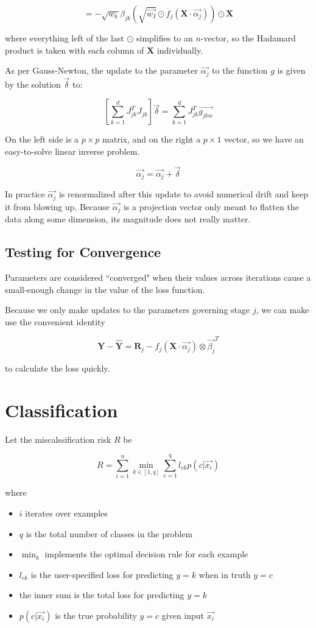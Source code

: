 \documentclass[12pt]{article}
\begin{document}
$$= -\sqrt{w_k} \beta_{jk} (\sqrt{\vec{w_I}} \odot \dot{f_j}(\pmb{X} \cdot \vec{\alpha_j})) \odot \pmb{X}$$

where everything left of the last $\odot$ simplifies to an $n$-vector, so the Hadamard product is taken with each column of $\pmb{X}$ individually.\newline

As per Gauss-Newton, the update to the parameter $\vec{\alpha_j}$ to the function $g$ is given by the solution $\vec{\delta}$ to:

$$\left[ \sum_{k=1}^d J_{jk}^T J_{jk} \right] \vec{\delta} = \sum_{k=1}^d J_{jk}^T \vec{g_{jkw}}$$

On the left side is a $p \times p$ matrix, and on the right a $p \times 1$ vector, so we have an easy-to-solve linear inverse problem.

$$ \vec{\alpha_j} = \vec{\alpha_j} + \vec{\delta} $$

In practice $\vec{\alpha_j}$ is renormalized after this update to avoid numerical drift and keep it from blowing up. Because $\vec{\alpha_j}$ is a projection vector only meant to flatten the data along some dimension, its magnitude does not really matter.

\subsection{Testing for Convergence}

Parameters are considered ``converged" when their values across iterations cause a small-enough change in the value of the loss function.

Because we only make updates to the parameters governing stage $j$, we can make use the convenient identity

$$\pmb{Y} - \pmb{\hat{Y}} = \pmb{R}_j - f_j(\pmb{X} \cdot \vec{\alpha_j}) \otimes \vec{\beta_j}^T$$

to calculate the loss quickly.

\section{Classification}

Let the miscalssification risk $R$ be

$$R = \sum_{i=1}^n \min_{k \in [1,q]} \sum_{c=1}^q l_{ck} p(c | \vec{x_i})$$

where
\begin{itemize}
	\setlength\itemsep{-2mm}
	\item $i$ iterates over examples
	\item $q$ is the total number of classes in the problem
	\item $\min_k$ implements the optimal decision rule for each example
	\item $l_{ck}$ is the user-specified loss for predicting $y=k$ when in truth $y=c$
	\item the inner sum is the total loss for predicting $y=k$
	\item $p(c | \vec{x_i})$ is the true probability $y=c$ given input $\vec{x_i}$
\end{itemize}
\end{document}
